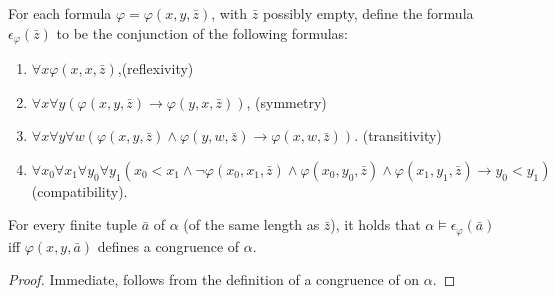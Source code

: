 \begin{prp}\label{prp:dcform}
	For each formula $\varphi=\varphi(x,y,\bar{z})$, with $\bar{z}$ possibly
	empty, define the formula $\epsilon_\varphi(\bar{z})$ to be the conjunction
	of the following formulas:
	\begin{enumerate}
		\item	$\forall x\varphi(x,x,\bar{z})$,\hfill(reflexivity)
		\item	$\forall x\forall
			y(\varphi(x,y,\bar{z})\rightarrow\varphi(y,x,\bar{z}))$,\hfill
			(symmetry)
		\item 	$\forall x\forall y\forall
			w(\varphi(x,y,\bar{z})\wedge\varphi(y,w,\bar{z})
			\rightarrow\varphi(x,w,\bar{z}))$.\hfill
			(transitivity)
		\item 	$\forall x_0\forall x_1\forall y_0\forall
			y_1(x_0<x_1\wedge\neg\varphi(x_0,x_1,\bar{z})
			\wedge\varphi(x_0,y_0,\bar{z})
			\wedge\varphi(x_1,y_1,\bar{z})\rightarrow
			y_0<y_1)$\phantom{}\hfill(compatibility).
	\end{enumerate}
	For every finite tuple $\bar{a}$ of $\alpha$ (of the same length as
	$\bar{z}$), it holds that $\alpha\models\epsilon_\varphi(\bar{a})$ iff
	$\varphi(x,y,\bar{a})$ defines a congruence of $\alpha$.
\end{prp}
\begin{proof}
	Immediate, follows from the definition of a congruence of on $\alpha$.
\end{proof}

